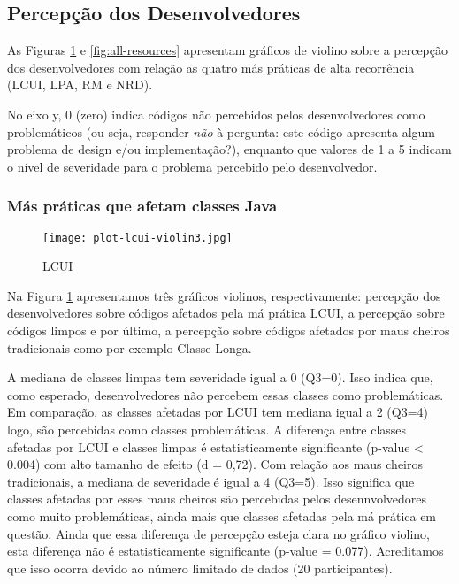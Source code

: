 \subsection{Percepção dos Desenvolvedores}

As Figuras \ref{fig:lcui} e \ref{fig:all-resources} apresentam gráficos de violino sobre a percepção dos desenvolvedores com relação as quatro más práticas de alta recorrência (LCUI, LPA, RM e NRD). 

No eixo y, 0 (zero) indica códigos não percebidos pelos desenvolvedores como problemáticos (ou seja, responder \emph{não} à pergunta: este código apresenta algum problema de design e/ou implementação?), enquanto que valores de 1 a 5 indicam o nível de severidade para o problema percebido pelo desenvolvedor.

\subsubsection{Más práticas que afetam classes Java}
\begin{figure}
	\centering
	\texttt{[image: plot-lcui-violin3.jpg]}
	\caption{LCUI}
	\label{fig:lcui}
\end{figure}

Na Figura \ref{fig:lcui} apresentamos três gráficos violinos, respectivamente: percepção dos desenvolvedores sobre códigos afetados pela má prática LCUI, a percepção sobre códigos limpos e por último, a percepção sobre códigos afetados por maus cheiros tradicionais como por exemplo Classe Longa. 

A mediana de classes limpas tem severidade igual a 0 (Q3=0). Isso indica que, como esperado, desenvolvedores não percebem essas classes como problemáticas. Em comparação, as classes afetadas por LCUI tem mediana igual a 2 (Q3=4) logo, são percebidas como classes problemáticas. A diferença entre classes afetadas por LCUI e classes limpas é estatisticamente significante (p-value < 0.004) com alto tamanho de efeito (d = 0,72). Com relação aos maus cheiros tradicionais, a mediana de severidade é igual a 4 (Q3=5). Isso significa que classes afetadas por esses maus cheiros são percebidas pelos desennvolvedores como muito problemáticas, ainda mais que classes afetadas pela má prática em questão. Ainda que essa diferença de percepção esteja clara no gráfico violino, esta diferença não é estatisticamente significante (p-value = 0.077). Acreditamos que isso ocorra devido ao número limitado de dados (20 participantes).


